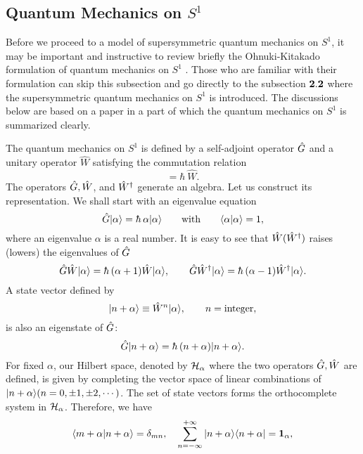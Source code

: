 \documentclass[a4paper,12pt]{article}
\begin{document}
\subsection{Quantum Mechanics on $S^1$}
Before we proceed to a model of supersymmetric quantum mechanics 
on $S^1$, it may be important and instructive to review briefly 
the Ohnuki-Kitakado formulation of quantum mechanics on $S^1$ \cite{ok}.
Those who are familiar with their formulation can skip this subsection and 
go directly to the subsection ${\bf 2.2}$ where the supersymmetric
quantum mechanics on $S^1$ is introduced. The discussions below are 
based on a paper \cite{tanimura} in a part of which the quantum mechanics 
on $S^1$ is summarized clearly. 
\par
The quantum mechanics on $S^1$ is 
defined by a self-adjoint operator $\hat G$ and a 
unitary operator $\hat W$ satisfying the commutation relation 
\begin{equation}
[\hat G, \hat W]=\hbar~{\hat W}.
\label{comm}
\end{equation}
The operators $\hat G, \hat W$, and ${\hat W}^{\dagger}$ generate an algebra.
Let us construct its representation. We shall start with 
an eigenvalue equation
\begin{equation}
{\hg} \ket{\alpha}=\hbar~\alpha \ket{\alpha}\qquad{\rm with}
\qquad \norm{\alpha}{\alpha}=1,
\end{equation}
where an eigenvalue $\alpha$ is a real number.
It is easy to see that $\hat W({\hat W}^{\dagger})$ raises (lowers) the eigenvalues of $\hat G$
\begin{equation}
{\hg}{\hw}\ket{\alpha}=\hbar~(\alpha+1)\hw \ket{\alpha},\qquad
{\hg}{\hwd}\ket{\alpha}=\hbar~(\alpha-1)\hwd\ket{\alpha}.
\end{equation}
A state vector defined by
\begin{equation}
|{n+\alpha}\rangle\equiv {\hat W}^n |{\alpha}\rangle, \qquad n={\rm integer},
\end{equation}   
is also an eigenstate of $\hat G$:
\begin{equation}
\hg\ket{n+\alpha}=\hbar~(n+\alpha)\ket{n+\alpha}.
\label{irred}
\end{equation} 
For fixed $\alpha$, our Hilbert space, denoted 
by ${\cal H}_{\alpha}$ where the two operators $\hat G, \hat W$
are defined, is given by completing the vector space of linear combinations
of $|{n+\alpha}\rangle (n=0,\pm 1, \pm 2, \cdots)$.
The set of state vectors forms the orthocomplete system in 
${\cal H}_{\alpha}$. Therefore, we have 
\begin{equation}
\langle{m+\alpha}|{n+\alpha}\rangle=\delta_{mn}, \quad
\sum_{n=-\infty}^{+\infty}|{n+\alpha}\rangle\langle {n+\alpha}|={\bf 1}_{\alpha},
\label{irred2}
\end{equation}
\end{document}
